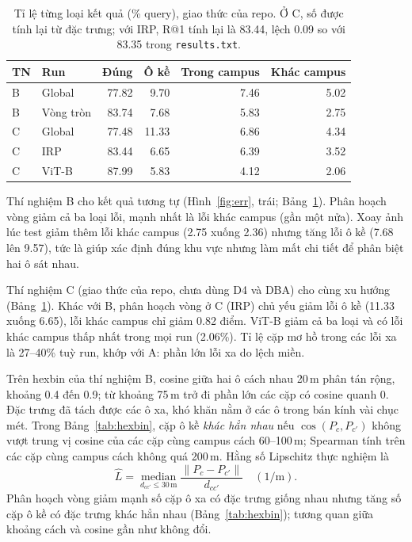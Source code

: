 \documentclass[11pt,a4paper]{article}
\begin{document}
\begin{table}[H]\centering\small
\caption{Tỉ lệ từng loại kết quả (\% query), giao thức của repo. Ở C, số được tính lại từ đặc trưng; với IRP, R@1 tính lại là 83.44, lệch 0.09 so với 83.35 trong \texttt{results.txt}.}\label{tab:loi}
\begin{tabular}{@{}llrrrr@{}}\toprule
TN & Run & Đúng & Ô kề & Trong campus & Khác campus\\\midrule
B & Global & 77.82 & 9.70 & 7.46 & 5.02\\
B & Vòng tròn & 83.74 & 7.68 & 5.83 & 2.75\\\midrule
C & Global & 77.48 & 11.33 & 6.86 & 4.34\\
C & IRP & 83.44 & 6.65 & 6.39 & 3.52\\
C & ViT-B & 87.99 & 5.83 & 4.12 & 2.06\\\bottomrule
\end{tabular}
\end{table}

Thí nghiệm B cho kết quả tương tự (Hình~\ref{fig:err}, trái; Bảng~\ref{tab:loi}). Phân hoạch vòng giảm cả ba loại lỗi, mạnh nhất là lỗi khác campus (gần một nửa). Xoay ảnh lúc test giảm thêm lỗi khác campus (2.75 xuống 2.36) nhưng tăng lỗi ô kề (7.68 lên 9.57), tức là giúp xác định đúng khu vực nhưng làm mất chi tiết để phân biệt hai ô sát nhau.

Thí nghiệm C (giao thức của repo, chưa dùng D4 và DBA) cho cùng xu hướng (Bảng~\ref{tab:loi}). Khác với B, phân hoạch vòng ở C (IRP) chủ yếu giảm lỗi ô kề (11.33 xuống 6.65), lỗi khác campus chỉ giảm 0.82 điểm. ViT-B giảm cả ba loại và có lỗi khác campus thấp nhất trong mọi run (2.06\%). Tỉ lệ cặp mơ hồ trong các lỗi xa là 27--40\% tuỳ run, khớp với A: phần lớn lỗi xa do lệch miền.

Trên hexbin của thí nghiệm B, cosine giữa hai ô cách nhau 20\,m phân tán rộng, khoảng 0.4 đến 0.9; từ khoảng 75\,m trở đi phần lớn các cặp có cosine quanh 0. Đặc trưng đã tách được các ô xa, khó khăn nằm ở các ô trong bán kính vài chục mét. Trong Bảng~\ref{tab:hexbin}, cặp ô kề \emph{khác hẳn nhau} nếu $\cos(P_c,P_{c'})$ không vượt trung vị cosine của các cặp cùng campus cách 60--100\,m; Spearman tính trên các cặp cùng campus cách không quá 200\,m. Hằng số Lipschitz thực nghiệm là
\begin{equation}\label{eq:lip}
\hat L=\operatorname*{median}_{d_{cc'}\le30\,\text{m}}\frac{\|P_c-P_{c'}\|}{d_{cc'}}\quad(1/\text{m}).
\end{equation}
Phân hoạch vòng giảm mạnh số cặp ô xa có đặc trưng giống nhau nhưng tăng số cặp ô kề có đặc trưng khác hẳn nhau (Bảng~\ref{tab:hexbin}); tương quan giữa khoảng cách và cosine gần như không đổi.
\end{document}
